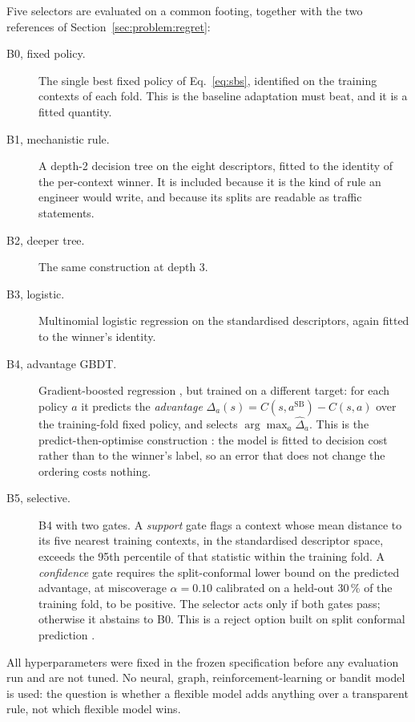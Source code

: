 \documentclass[preprint,12pt]{elsarticle}
\begin{document}
Five selectors are evaluated on a common footing, together with the two
references of Section~\ref{sec:problem:regret}:

\begin{description}
\item[B0, fixed policy.] The single best fixed policy of Eq.~\eqref{eq:sbs},
identified on the training contexts of each fold. This is the baseline
adaptation must beat, and it is a fitted quantity.
\item[B1, mechanistic rule.] A depth-2 decision tree on the eight descriptors,
fitted to the identity of the per-context winner. It is included because it is
the kind of rule an engineer would write, and because its splits are readable as
traffic statements.
\item[B2, deeper tree.] The same construction at depth 3.
\item[B3, logistic.] Multinomial logistic regression on the standardised
descriptors, again fitted to the winner's identity.
\item[B4, advantage GBDT.] Gradient-boosted regression
\citep{friedman2001gbm,ke2017lightgbm}, but trained on a different target: for
each policy $a$ it predicts the \emph{advantage}
$\Delta_a(s) = C(s,a^{\mathrm{SB}}) - C(s,a)$ over the training-fold fixed
policy, and selects $\arg\max_a \hat\Delta_a$. This is the predict-then-optimise
construction \citep{elmachtoub2022spo}: the model is fitted to decision cost
rather than to the winner's label, so an error that does not change the ordering
costs nothing.
\item[B5, selective.] B4 with two gates. A \emph{support} gate flags a context
whose mean distance to its five nearest training contexts, in the standardised
descriptor space, exceeds the 95th percentile of that statistic within the
training fold. A \emph{confidence} gate requires the split-conformal lower bound
on the predicted advantage, at miscoverage $\alpha=0.10$ calibrated on a held-out
30\,\% of the training fold, to be positive. The selector acts only if both gates
pass; otherwise it abstains to B0. This is a reject option
\citep{chow1970reject} built on split conformal prediction
\citep{vovk2005alrw,lei2018conformal}.
\end{description}

All hyperparameters were fixed in the frozen specification before any evaluation
run and are not tuned. No neural, graph, reinforcement-learning or bandit model
is used: the question is whether a flexible model adds anything over a
transparent rule, not which flexible model wins.
\end{document}
